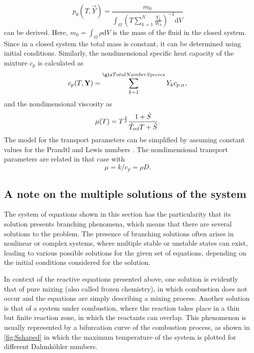 \begin{equation}
	p_0(T, \vec{Y}) = \frac{m_0}{\int_\Omega \left( T\sum_{k=1}^{N} \frac{Y_k}{W_k} \right)^{-1}\text{d}V} \label{eq:p0Condition}
\end{equation}
can be derived. Here, $m_0 = \int_\Omega \rho \text{d}V$ is the mass of the fluid in the closed system. Since in a closed system the total mass is constant, it can be determined using initial conditions.
Similarly, the nondimensional specific heat capacity of the mixture $c_p$ is calculated as
\begin{equation}\label{eq:nondim_cpmixture}
	c_p(T,\mathbf{Y}) = \SumOvAllns Y_k c_{p,\alpha},
\end{equation}
and the nondimensional viscosity as
\begin{equation} \label{eq:nondim_sutherland}
	\mu(T) =  T^{\frac{3}{2}}\frac{1+\hat{S} }{\hat T_{\text{ref}}T+\hat{S}}.
\end{equation}
The model for the transport parameters can be simplified by assuming constant values for the Prandtl and Lewis numbers \parencite{smokeFormulationPremixedNonpremixed1991}.  The nondimensional transport parameters are related in that case with 
\begin{equation}
    \mu = k/c_p = \rho D.
\end{equation}
\subsection{A note on the multiple solutions of the system}
The system of equations shown in this section has the particularity that its solution presents branching phenomena, which means that there are several solutions to the problem. The presence of branching solutions often arises in nonlinear or complex systems, where multiple stable or unstable states can exist, leading to various possible solutions for the given set of equations, depending on the initial conditions considered for the solution.

In context of the reactive equations presented above, one solution is evidently that of pure mixing (also called frozen chemistry), in which combustion does not occur and the equations are simply describing a mixing process. Another solution is that of a system under combustion, where the reaction takes place in a thin but finite reaction zone, in which the reactants can overlap. This phenomenon is usually represented by a bifurcation curve of the combustion process, as shown in \cref{fig:Sshaped} in which the maximum temperature of the system is plotted for different Dahmköhler numbers. 

